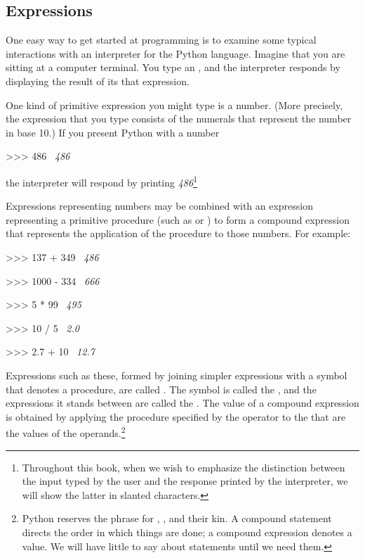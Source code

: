 \subsection{Expressions}
\label{Section 1.1.1}

One easy way to get started at programming is to examine some typical
interactions with an interpreter for the Python language. Imagine that you
are sitting at a computer terminal. You type an , and
the interpreter responds by displaying the result of its 
that expression.

One kind of primitive expression you might type is a number. (More precisely,
the expression that you type consists of the numerals that represent the number
in base 10.) If you present Python with a number

\begin{codeBlock}
>>> 486
~\textit{486}~
\end{codeBlock}

\noindent
the interpreter will respond by printing \textit{486}\footnote{Throughout this
book, when we wish to emphasize the distinction between the input typed by the
user and the response printed by the interpreter, we will show the latter in
slanted characters.}

Expressions representing numbers may be combined with an expression
representing a primitive procedure (such as \code{+} or \code{*}) to form a
compound expression that represents the application of the procedure to those
numbers. For example:

\begin{codeBlock}
>>> 137 + 349
~\textit{486}~
\end{codeBlock}

\begin{codeBlock}
>>> 1000 - 334
~\textit{666}~
\end{codeBlock}

\begin{codeBlock}
>>> 5 * 99
~\textit{495}~
\end{codeBlock}

\begin{codeBlock}
>>> 10 / 5
~\textit{2.0}~
\end{codeBlock}

\begin{codeBlock}
>>> 2.7 + 10
~\textit{12.7}~
\end{codeBlock}

\noindent
Expressions such as these, formed by joining simpler expressions with a symbol
that denotes a procedure, are called . The symbol
is called the , and the expressions it stands between are
called the . The value of a compound expression is obtained by
applying the procedure specified by the operator to the  that
are the values of the operands.\footnote{Python reserves the phrase
 for , ,  and their
kin. A compound statement directs the order in which things are done; a compound
expression denotes a value. We will have little to say about statements until we
need them.}

